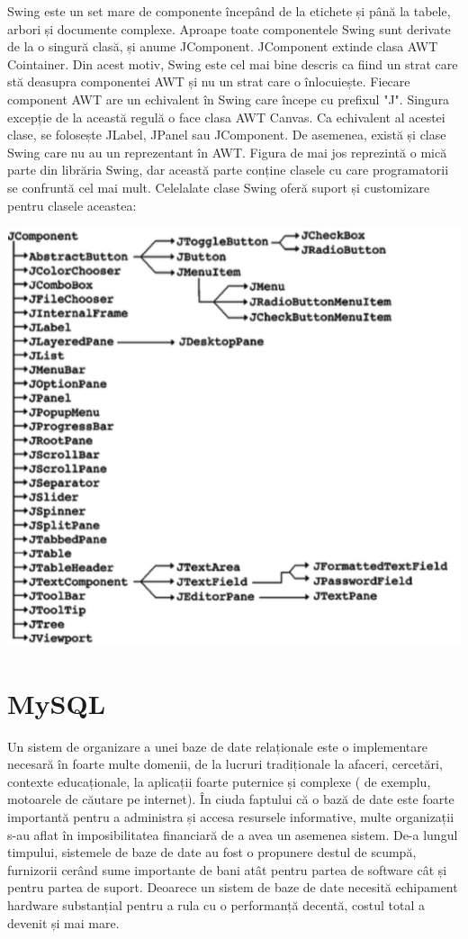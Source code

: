\documentclass[12pt]{book}
\begin{document}
Swing este un set mare de componente începând de la etichete și până la tabele, arbori și documente complexe. Aproape toate componentele Swing sunt derivate de la o singură clasă, și anume JComponent. JComponent extinde clasa AWT Cointainer. Din acest motiv, Swing este cel mai bine descris ca fiind un strat care stă deasupra componentei AWT și nu un strat care o înlocuiește. Fiecare component AWT are un echivalent în Swing care începe cu prefixul "J". Singura excepție de la această regulă o face clasa AWT Canvas. Ca echivalent al acestei clase, se folosește JLabel, JPanel sau JComponent. De asemenea, există și clase Swing care nu au un reprezentant în AWT. Figura de mai jos reprezintă o mică parte din librăria Swing, dar această parte conține clasele cu care programatorii se confruntă cel mai mult. Celelalate clase Swing oferă suport și customizare pentru clasele aceastea:
\begin{center}
	\includegraphics{swing}
	\cite{swingBook}
\end{center}
\section{MySQL}
Un sistem de organizare a unei baze de date relaționale este o implementare necesară în foarte multe domenii, de la lucruri tradiționale la afaceri, cercetări, contexte educaționale, la aplicații foarte puternice și complexe ( de exemplu, motoarele de căutare pe internet). În ciuda faptului că o bază de date este foarte importantă pentru a administra și accesa resursele informative, multe organizații s-au aflat în imposibilitatea financiară de a avea un asemenea sistem. De-a lungul timpului, sistemele de baze de date au fost o propunere destul de scumpă, furnizorii cerând sume importante de bani atât pentru partea de software cât și pentru partea de suport. Deoarece un sistem de baze de date necesită echipament hardware substanțial pentru a rula cu o performanță decentă, costul total a devenit și mai mare. 
\end{document}
